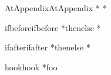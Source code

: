 \documentclass{article}
\begin{document}
\makeatletter

\begin{qstest}{AtAppendix}{AtAppendix}
  \def\defaulthook{\appendixtrue}
  \Expect*{\meaning\defaulthook}*{\meaning\apptools@hook}
  \g@addto@macro\defaulthook{\def\fooafterappendix{foo}}
  \Expect*{\meaning\defaulthook}*{\meaning\apptools@hook}
\end{qstest}

\begin{qstest}{ifbefore}{ifbefore}
  *{\ifappendix then\else else\fi}
  *{}
\end{qstest}

\appendix

\begin{qstest}{ifafter}{ifafter}
  *{\ifappendix then\else else\fi}
  *{}
\end{qstest}

\begin{qstest}{hook}{hook}
  \def\expected{foo}
  \Expect*{\meaning\fooafterappendix}*{\meaning\expected}
\end{qstest}
\end{document}
